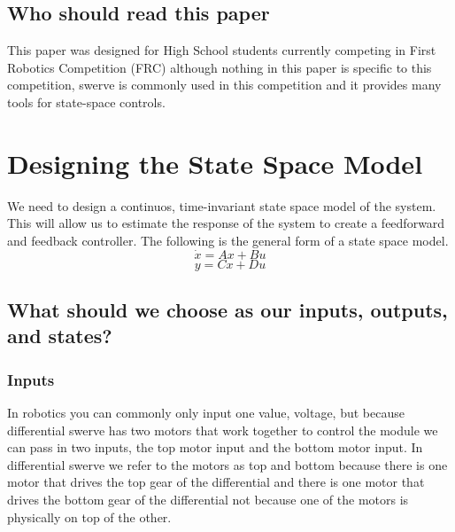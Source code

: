 \documentclass{scrartcl}
\begin{document}
\subsection{Who should read this paper}
This paper was designed for High School students currently competing in First Robotics Competition (FRC) although nothing in this paper is specific to this competition, swerve is commonly used in this competition and it provides many tools for state-space controls.

\newpage
\section{Designing the State Space Model}

We need to design a continuos, time-invariant state space model of the system. This will allow us to estimate the response of the system to create a feedforward and feedback controller. The following is the general form of a state space model.
\begin{equation} \label{state-change}
    \dot{x} = Ax + Bu
\end{equation}
\begin{equation} \label{output}
    y = Cx + Du
\end{equation}

\subsection*{What should we choose as our inputs, outputs, and states?}
\subsubsection*{Inputs}
In robotics you can commonly only input one value, voltage, but because differential swerve has two motors that work together to control the module we can pass in two inputs, the top motor input and the bottom motor input. In differential swerve we refer to the motors as top and bottom because there is one motor that drives the top gear of the differential and there is one motor that drives the bottom gear of the differential not because one of the motors is physically on top of the other.
\end{document}
